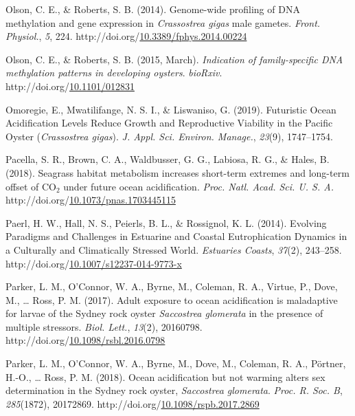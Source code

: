 \documentclass [11pt, proquest] {uwthesis}[2015/03/03]
\newlength{\cslhangindent}
\newenvironment{CSLReferences}%
{\setlength{\parindent}{0pt}%
\everypar{\setlength{\hangindent}{\cslhangindent}}\ignorespaces}%
{\par}
\begin{document}
\begin{CSLReferences}{1}{0}
\leavevmode\hypertarget{ref-Olson2014}{}%
Olson, C. E., \& Roberts, S. B. (2014). {Genome-wide profiling of DNA methylation and gene expression in \emph{Crassostrea gigas} male gametes}. \emph{Front. Physiol.}, \emph{5}, 224. http://doi.org/\href{https://doi.org/10.3389/fphys.2014.00224}{10.3389/fphys.2014.00224}

\leavevmode\hypertarget{ref-Olson2015}{}%
Olson, C. E., \& Roberts, S. B. (2015, March). \emph{{Indication of family-specific DNA methylation patterns in developing oysters}}. \emph{bioRxiv}. http://doi.org/\href{https://doi.org/10.1101/012831}{10.1101/012831}

\leavevmode\hypertarget{ref-Omoregie2019}{}%
Omoregie, E., Mwatilifange, N. S. I., \& Liswaniso, G. (2019). {Futuristic Ocean Acidification Levels Reduce Growth and Reproductive Viability in the Pacific Oyster (\emph{Crassostrea gigas})}. \emph{J. Appl. Sci. Environ. Manage.}, \emph{23}(9), 1747--1754.

\leavevmode\hypertarget{ref-Pacella2018}{}%
Pacella, S. R., Brown, C. A., Waldbusser, G. G., Labiosa, R. G., \& Hales, B. (2018). {Seagrass habitat metabolism increases short-term extremes and long-term offset of {CO\(_2\)} under future ocean acidification}. \emph{Proc. Natl. Acad. Sci. U. S. A.} http://doi.org/\href{https://doi.org/10.1073/pnas.1703445115}{10.1073/pnas.1703445115}

\leavevmode\hypertarget{ref-Paerl2014}{}%
Paerl, H. W., Hall, N. S., Peierls, B. L., \& Rossignol, K. L. (2014). {Evolving Paradigms and Challenges in Estuarine and Coastal Eutrophication Dynamics in a Culturally and Climatically Stressed World}. \emph{Estuaries Coasts}, \emph{37}(2), 243--258. http://doi.org/\href{https://doi.org/10.1007/s12237-014-9773-x}{10.1007/s12237-014-9773-x}

\leavevmode\hypertarget{ref-Parker2017}{}%
Parker, L. M., O'Connor, W. A., Byrne, M., Coleman, R. A., Virtue, P., Dove, M., \ldots{} Ross, P. M. (2017). {Adult exposure to ocean acidification is maladaptive for larvae of the Sydney rock oyster \emph{Saccostrea glomerata} in the presence of multiple stressors}. \emph{Biol. Lett.}, \emph{13}(2), 20160798. http://doi.org/\href{https://doi.org/10.1098/rsbl.2016.0798}{10.1098/rsbl.2016.0798}

\leavevmode\hypertarget{ref-Parker2018}{}%
Parker, L. M., O'Connor, W. A., Byrne, M., Dove, M., Coleman, R. A., Pörtner, H.-O., \ldots{} Ross, P. M. (2018). {Ocean acidification but not warming alters sex determination in the Sydney rock oyster, \emph{Saccostrea glomerata}}. \emph{Proc. R. Soc. B}, \emph{285}(1872), 20172869. http://doi.org/\href{https://doi.org/10.1098/rspb.2017.2869}{10.1098/rspb.2017.2869}


\end{CSLReferences}
\end{document}
